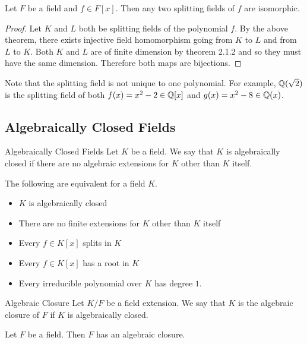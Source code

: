 \documentclass[a4paper]{article}
\begin{document}
\begin{crl}{}{} Let $F$ be a field and $f\in F[x]$. Then any two splitting fields of $f$ are isomorphic. \tcbline
\begin{proof}
Let $K$ and $L$ both be splitting fields of the polynomial $f$. By the above theorem, there exists injective field homomorphism going from $K$ to $L$ and from $L$ to $K$. Both $K$ and $L$ are of finite dimension by theorem 2.1.2 and so they must have the same dimension. Therefore both maps are bijections. 
\end{proof}
\end{crl}

Note that the splitting field is not unique to one polynomial. For example, $\mathbb{Q}(\sqrt{2})$ is the splitting field of both $f(x)=x^2-2\in\mathbb{Q}[x]$ and $g(x)=x^2-8\in\mathbb{Q}(x)$. 

\subsection{Algebraically Closed Fields}
\begin{defn}{Algebraically Closed Fields}{} Let $K$ be a field. We say that $K$ is algebraically closed if there are no algebraic extensions for $K$ other than $K$ itself. 
\end{defn}

\begin{lmm}{}{} The following are equivalent for a field $K$. 
\begin{itemize}
\item $K$ is algebraically closed
\item There are no finite extensions for $K$ other than $K$ itself
\item Every $f\in K[x]$ splits in $K$
\item Every $f\in K[x]$ has a root in $K$\
\item Every irreducible polynomial over $K$ has degree $1$. 
\end{itemize}
\end{lmm}

\begin{defn}{Algebraic Closure}{} Let $K/F$ be a field extension. We say that $K$ is the algebraic closure of $F$ if $K$ is algebraically closed. 
\end{defn}

\begin{prp}{}{} Let $F$ be a field. Then $F$ has an algebraic closure. 
\end{prp}
\end{document}
